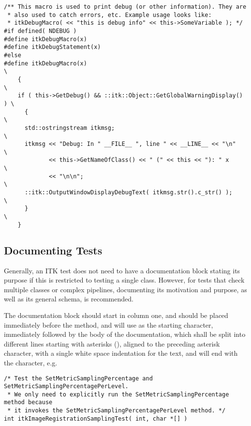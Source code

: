 \small
\begin{verbatim}
/** This macro is used to print debug (or other information). They are
 * also used to catch errors, etc. Example usage looks like:
 * itkDebugMacro( << "this is debug info" << this->SomeVariable ); */
#if defined( NDEBUG )
#define itkDebugMacro(x)
#define itkDebugStatement(x)
#else
#define itkDebugMacro(x)                                                \
    {                                                                   \
    if ( this->GetDebug() && ::itk::Object::GetGlobalWarningDisplay() ) \
      {                                                                 \
      std::ostringstream itkmsg;                                        \
      itkmsg << "Debug: In " __FILE__ ", line " << __LINE__ << "\n"     \
             << this->GetNameOfClass() << " (" << this << "): " x       \
             << "\n\n";                                                 \
      ::itk::OutputWindowDisplayDebugText( itkmsg.str().c_str() );      \
      }                                                                 \
    }
\end{verbatim}
\normalsize


\subsection{Documenting Tests}
\label{subsec:DocumentingTests}

Generally, an ITK test does not need to have a documentation block stating its
purpose if this is restricted to testing a single class. However, for tests that
check multiple classes or complex pipelines, documenting its motivation and
purpose, as well as its general schema, is recommended.

The documentation block should start in column one, and should be placed
immediately before the  method, and will use \code{/*} as the
starting character, immediately followed by the body of the documentation, which
shall be split into different lines starting with asterisks (\code{*}), aligned
to the preceding asterisk character, with a single white space indentation for
the text, and will end with the \code{*/} character, e.g.

\small
\begin{verbatim}
/* Test the SetMetricSamplingPercentage and SetMetricSamplingPercentagePerLevel.
 * We only need to explicitly run the SetMetricSamplingPercentage method because
 * it invokes the SetMetricSamplingPercentagePerLevel method. */
int itkImageRegistrationSamplingTest( int, char *[] )
\end{verbatim}
\normalsize

